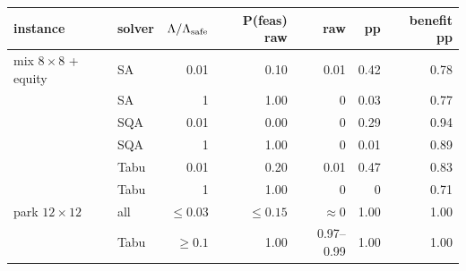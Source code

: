 \begin{tabular}{llrrrrr}
\toprule
instance & solver & $\Lambda/\Lambda_{\mathrm{safe}}$ & P(feas) raw & \Popt{} raw & \Popt{} pp & benefit pp \\
\midrule
mix $8\times8$ + equity & SA & 0.01 & 0.10 & 0.01 & 0.42 & 0.78 \\
 & SA & 1 & 1.00 & 0 & 0.03 & 0.77 \\
 & SQA & 0.01 & 0.00 & 0 & 0.29 & 0.94 \\
 & SQA & 1 & 1.00 & 0 & 0.01 & 0.89 \\
 & Tabu & 0.01 & 0.20 & 0.01 & 0.47 & 0.83 \\
 & Tabu & 1 & 1.00 & 0 & 0 & 0.71 \\
park $12\times12$ & all & $\le0.03$ & $\le0.15$ & $\approx0$ & 1.00 & 1.00 \\
 & Tabu & $\ge0.1$ & 1.00 & 0.97--0.99 & 1.00 & 1.00 \\
\bottomrule
\end{tabular}
